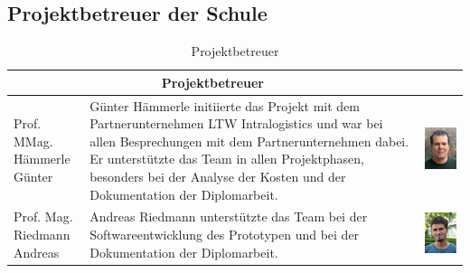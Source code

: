 \subsection{Projektbetreuer der Schule}
\begin{table}[H]
  \centering
  \begin{tabular}{lp{}c}                         \\
    \multicolumn{2}{c}{\textbf{Projektbetreuer}} \\
    \toprule
    \makecell[l]{Prof. MMag.                     \\Hämmerle Günter} & Günter Hämmerle initiierte das Projekt mit dem Partnerunternehmen LTW Intralogistics und war bei allen Besprechungen mit dem Partnerunternehmen dabei. Er unterstützte das Team in allen Projektphasen, besonders bei der Analyse der Kosten und der Dokumentation der Diplomarbeit. & \begin{minipage}{.3\textwidth}\centering\includegraphics{images/günterhämmerle.jpg} \end{minipage} \\
    \midrule
    \makecell[l]{Prof. Mag.                      \\Riedmann Andreas} & Andreas Riedmann unterstützte das Team bei der Softwareentwicklung des Prototypen und bei der Dokumentation der Diplomarbeit. & \begin{minipage}{.3\textwidth}\centering\includegraphics{images/andreasriedmann.jpg} \end{minipage} \\
    \bottomrule
  \end{tabular}
  \caption{Projektbetreuer}
  \label{tab:projektbetreuer}
\end{table}


